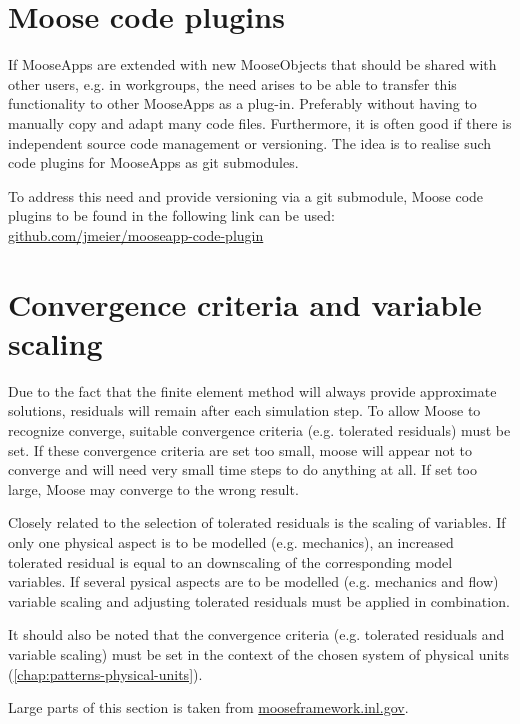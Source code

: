 \section{Moose code plugins}
\label{chap:patterns-code-plugins}

If MooseApps are extended with new MooseObjects that should be shared with
other users, e.g. in workgroups, the need arises to be able to transfer this
functionality to other MooseApps as a plug-in. Preferably without having to
manually copy and adapt many code files. Furthermore, it is often good if there
is independent source code management or versioning. The idea is to realise
such code plugins for MooseApps as git submodules.

To address this need and provide versioning via a git submodule, Moose code
plugins to be found in the following link can be used:
\href{https://github.com/jmeier/mooseapp-code-plugin}{github.com/jmeier/mooseapp-code-plugin}

\section{Convergence criteria and variable scaling}
\label{chap:patterns-converge-criteria-and-scaling}

Due to the fact that the finite element method will always provide approximate
solutions, residuals will remain after each simulation step. To allow Moose to
recognize converge, suitable convergence criteria (e.g. tolerated residuals)
must be set. If these convergence criteria are set too small, moose will appear
not to converge and will need very small time steps to do anything at all. If
set too large, Moose may converge to the wrong result.

Closely related to the selection of tolerated residuals is the scaling of
variables. If only one physical aspect is to be modelled (e.g. mechanics), an
increased tolerated residual is equal to an downscaling of the corresponding
model variables. If several pysical aspects are to be modelled (e.g. mechanics
and flow) variable scaling and adjusting tolerated residuals must be applied in
combination.

It should also be noted that the convergence criteria (e.g. tolerated residuals
and variable scaling) must be set in the context of the chosen system of
physical units (\autoref{chap:patterns-physical-units}).

Large parts of this section is taken from
\href{https://mooseframework.inl.gov/modules/porous_flow/convergence.html}{mooseframework.inl.gov}.

